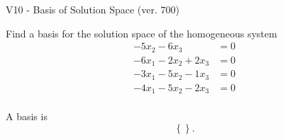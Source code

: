 \begin{exercise}
  \begin{exerciseTitle}V10 - Basis of Solution Space (ver. 700)\end{exerciseTitle}
  \begin{exerciseStatement}
    Find a basis for the solution space of the homogeneous system 
\begin{align*}
 -5 x_ 2 -6 x_ 3 &= 0  \\ 
  -6 x_ 1 -2 x_ 2 + 2 x_ 3 &= 0  \\ 
  -3 x_ 1 -5 x_ 2 -1 x_ 3 &= 0  \\ 
  -4 x_ 1 -5 x_ 2 -2 x_ 3 &= 0  \\ 
 \end{align*}


 
  \end{exerciseStatement}

  \begin{exerciseAnswer}
   A basis is   
\[\left\{\right\}.\]

  


  \end{exerciseAnswer}
\end{exercise}